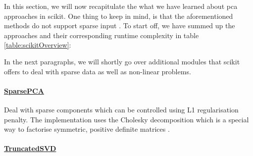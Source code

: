 In this section, we will now recapitulate the what we have learned about \acrlong{pca} approaches in \gls{scikit}.
One thing to keep in mind, is that the aforementioned methods do not support sparse input \cite{scikit-learn}.
To start off, we have summed up the approaches and their corresponding runtime complexity in table \ref{table:scikitOverview}:

\begin{table}[h]
	\centering
	\caption{Overview of \gls{scikit}'s \gls{pca} implementations}
	\label{table:scikitOverview}
\end{table}
\medskip



In the next paragraphs, we will shortly go over additional modules that \gls{scikit} offers to deal with sparse data as well as non-linear problems.

\paragraph{\href{https://scikit-learn.org/stable/modules/generated/sklearn.decomposition.SparsePCA.html\#sklearn.decomposition.SparsePCA}{SparsePCA}}

Deal with sparse components which can be controlled using L1 regularisation penalty.
The implementation uses the Cholesky decomposition which is a special way to factorise symmetric, positive definite matrices \cite{deisenroth2020mathematics}.


\paragraph{\href{https://scikit-learn.org/stable/modules/generated/sklearn.decomposition.TruncatedSVD.html\#sklearn.decomposition.TruncatedSVD}{TruncatedSVD}}

